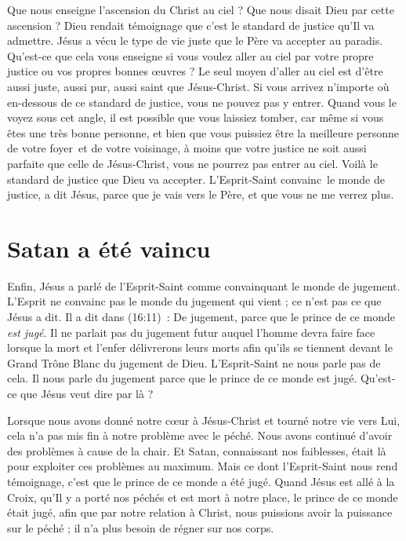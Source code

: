 Que nous enseigne l'ascension du Christ au ciel ?
 Que nous disait Dieu par cette ascension ?
 Dieu rendait témoignage que c'est le standard de justice qu'Il va admettre.
 Jésus a vécu le type de vie juste que le Père va accepter au paradis.
 Qu'est-ce que cela vous enseigne si vous voulez aller au ciel par votre propre
 justice ou vos propres bonnes œuvres ?
 Le seul moyen d'aller au ciel est d'être aussi juste, aussi pur,
 aussi saint que Jésus-Christ.
 Si vous arrivez n'importe où en-dessous de ce standard de justice,
 vous ne pouvez pas y entrer. Quand vous le voyez sous cet angle,
 il est possible que vous laissiez tomber, car même si vous êtes une très bonne
 personne, et bien que vous puissiez être la meilleure personne de votre foyer~et %
 de votre voisinage, à moins que votre justice ne soit aussi parfaite
 que celle de Jésus-Christ, vous ne pourrez pas entrer au ciel.
 Voilà le standard de justice que Dieu va accepter.
 L'Esprit-Saint convainc~le %
 monde de justice, a dit Jésus,
 \og parce que je vais vers le Père, et que vous ne me verrez plus. \fg{}


\section{Satan a \'et\'e vaincu}

Enfin, Jésus a parlé de l'Esprit-Saint comme convainquant le mon\-de de jugement.
 L'Esprit ne convainc pas le monde du jugement qui vient ;
 ce n'est pas ce que Jésus a dit. Il a dit dans (16:11)~:
 \og De jugement, parce que le prince de ce monde \emph{est jugé}. \fg{}
 Il ne parlait pas du jugement futur auquel l'homme devra faire face
 lorsque la mort et l'enfer délivrerons leurs morts afin qu'ils se tiennent
 devant le Grand Trône Blanc du jugement de Dieu.
 L'Esprit-Saint ne nous parle pas de cela. Il nous parle du jugement
 \og parce que le prince de ce monde est jugé. \fg{}
 Qu'est-ce que Jésus veut dire par là ?

Lorsque nous avons donné notre cœur à Jésus-Christ et tourné notre vie
 vers Lui, cela n'a pas mis fin à notre problème avec le péché.
 Nous avons continué d'avoir des problèmes à cause de la chair.
 Et Satan, connaissant nos faiblesses, était là pour exploiter ces problèmes
 au maximum. Mais ce dont l'Esprit-Saint nous rend témoignage,
 c'est que le prince de ce monde a été jugé.
 Quand Jésus est allé à la Croix, qu'Il y a porté nos péchés et est mort
 à notre place, le prince de ce monde était jugé,
 afin que par notre relation à Christ, nous puissions avoir la puissance
 sur le péché ; il n'a plus besoin de régner sur nos corps.

